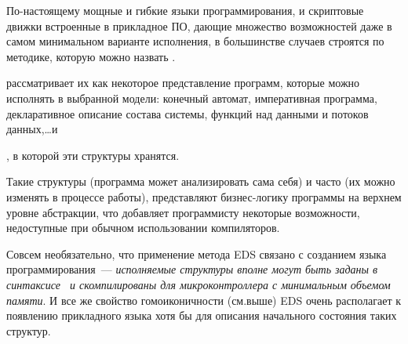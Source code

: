 \label{eds}

По-настоящему мощные и гибкие языки программирования, и скриптовые
движки встроенные в прикладное ПО, дающие множество возможностей даже в самом минимальном варианте
исполнения, в большинстве случаев строятся по методике, которую можно назвать
.

\begin{description}[nosep]
\item[интерпретатор структур данных] рассматривает их как некоторое
представление программ, которые можно исполнять в выбранной модели: конечный
автомат, императивная программа, декларативное описание состава системы, функций
над данными и потоков данных,\ldots и
\item[память интерпретатора], в которой эти структуры хранятся.
\end{description}

Такие структуры  (программа может анализировать сама себя) и
часто  (их можно изменять в процессе работы), представляют
бизнес-логику программы на верхнем уровне абстракции, что добавляет программисту
некоторые возможности, недоступные при обычном использовании компиляторов.

Совсем необязательно, что применение метода EDS связано с созданием языка
программирования\ --- \emph{исполняемые структуры вполне могут быть заданы в
синтаксисе \emc\ и скомпилированы для микроконтроллера с минимальным объемом
памяти}. И все же свойство гомоиконичности (см.выше) EDS очень располагает к
появлению прикладного языка хотя бы для
описания начального состояния таких структур.
